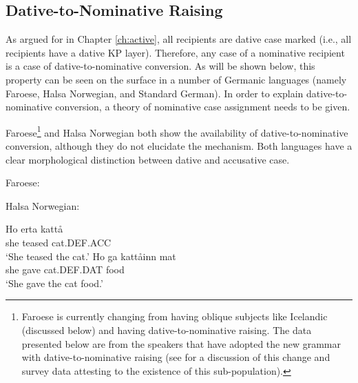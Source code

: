 \subsection{Dative-to-Nominative Raising}

As argued for in Chapter \ref{ch:active}, all recipients are dative case marked (i.e., all recipients have a dative KP layer). Therefore, any case of a nominative recipient is a case of dative-to-nominative conversion. As will be shown below, this property can be seen on the surface in a number of Germanic languages (namely Faroese, Halsa Norwegian, and Standard German). In order to explain dative-to-nominative conversion, a theory of nominative case assignment needs to be given.

Faroese\footnote{Faroese is currently changing from having oblique subjects like Icelandic (discussed below) and having dative-to-nominative raising. The data presented below are from the speakers that have adopted the new grammar with dative-to-nominative raising (see \cite{Eyorsson.2012} for a discussion of this change and survey data attesting to the existence of this sub-population).} and Halsa Norwegian both show the availability of dative-to-nominative conversion, although they do not elucidate the mechanism. Both languages have a clear morphological distinction between dative and accusative case.

\begin{exe}
	\ex Faroese:
		\begin{xlist}
		\end{xlist}
	\ex Halsa Norwegian:
	\begin{xlist}
		\ex \gll Ho erta katt\aa \\
			she teased cat.DEF.ACC \\
			\trans `She teased the cat.'
		\ex \gll Ho ga katt\aa inn mat \\
			she gave cat.DEF.DAT food \\
			\trans `She gave the cat food.'
	\end{xlist}
\end{exe}

